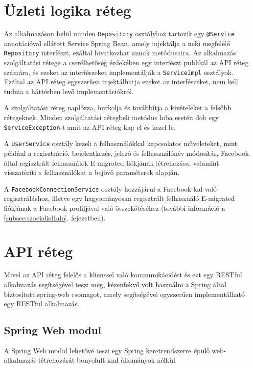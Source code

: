 \section{Üzleti logika réteg}
\label{subsec:szolgaltatas}
Az alkalmazáson belül minden \texttt{Repository} osztályhoz tartozik egy \texttt{@Service} annotációval ellátott Service Spring Bean, amely injektálja a neki megfelelő \texttt{Repository} interfészt, ezáltal hivatkozhat annak metódusaira. Az alkalmazás szolgáltatási rétege a cserélhetőség érdekében egy interfészt publikál az API réteg számára, és ezeket az interfészeket implementálják a \texttt{ServiceImpl} osztályok. Ezáltal az API réteg egyszerűen injektálhatja ezeket az interfészeket, nem kell tudnia a háttérben levő implementációkról. 

A szolgáltatási réteg naplózza, burkolja és továbbítja a kivételeket a felsőbb rétegeknek. Minden szolgáltatási rétegbeli metódus hiba esetén dob egy \texttt{ServiceException}-t amit az API réteg kap el és kezel le.

A \texttt{UserService} osztály kezeli a felhasználókkal kapcsolatos műveleteket, mint például a regisztráció, bejelentkezés, jelszó és felhasználónév módosítás, Facebook által regisztrált felhasználók E-migrated fiókjának létrehozása, valamint visszatéríti a felhasználókat a bejövő paraméterek alapján. 

A \texttt{FacebookConnectionService} osztály hozzájárul a Facebook-kal való regisztráláshoz, illetve egy hagyományosan regisztrált felhasználó E-migrated fiókjának a Facebook profiljával való összekötéséhez (további információ a  \ref{subsec:szocialisHalo}. fejezetben).


\section{API réteg}
\label{subsec:API}

Mivel az API réteg felelős a klienssel való kommunikációért és ezt egy RESTful alkalmazás segítségével teszi meg, kézenfekvő volt használni a Spring által biztosított spring-web csomagot, amely segítségével egyszerűen implementálható egy RESTful alkalmazás. 

\subsection{Spring Web modul}\label{subsubsec:SpringWeb}
A Spring Web modul lehetővé teszi egy Spring keretrendszerre épülő web-alkalmazás létrehozását bonyolult xml állományok nélkül. 

